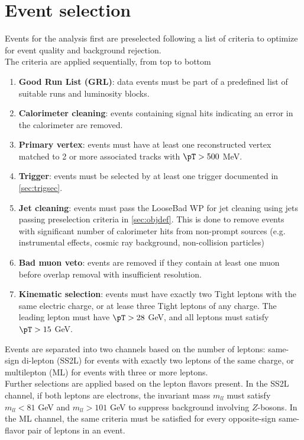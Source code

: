 \documentclass[../thesis.tex]{subfiles}
\begin{document}
\vspace{-1\baselineskip}


\section{Event selection}
Events for the analysis first are preselected following a list of criteria to optimize for event quality and background rejection.\\
The criteria are applied sequentially, from top to bottom

\begin{enumerate}
\item \textbf{Good Run List (GRL)}: data events must be part of a predefined list of suitable runs and luminosity blocks.
\item \textbf{Calorimeter cleaning}: events containing signal hits indicating an error in the calorimeter are removed.
\item \textbf{Primary vertex}: events must have at least one reconstructed vertex matched to 2 or more associated tracks with $\pT>500$ MeV.
\item \textbf{Trigger}: events must be selected by at least one trigger documented in \autoref{sec:trigsec}.
\item \textbf{Jet cleaning}: events must pass the LooseBad WP for jet cleaning using jets passing preselection criteria in \autoref{sec:objdef}. This is done to remove events with significant number of calorimeter hits from non-prompt sources (e.g. instrumental effects, cosmic ray background, non-collision particles)
\item \textbf{Bad muon veto}: events are removed if they contain at least one muon before overlap removal with insufficient \pT resolution.
\item \textbf{Kinematic selection}: events must have exactly two Tight leptons with the same electric charge, or at lease three Tight leptons of any charge. The leading lepton must have $\pT>28$ GeV, and all leptons must satisfy $\pT>15$ GeV.
\end{enumerate}

Events are separated into two channels based on the number of leptons: same-sign di-lepton (SS2L) for events with exactly two leptons of the same charge, or multilepton (ML) for events with three or more leptons.\\
Further selections are applied based on the lepton flavors present. In the SS2L channel, if both leptons are electrons, the invariant mass $m_{ll}$ must satisfy $m_{ll}<81$ GeV and $m_{ll}>101$ GeV to suppress background involving $Z$-bosons. In the ML channel, the same criteria must be satisfied for every opposite-sign same-flavor pair of leptons in an event.
\end{document}
